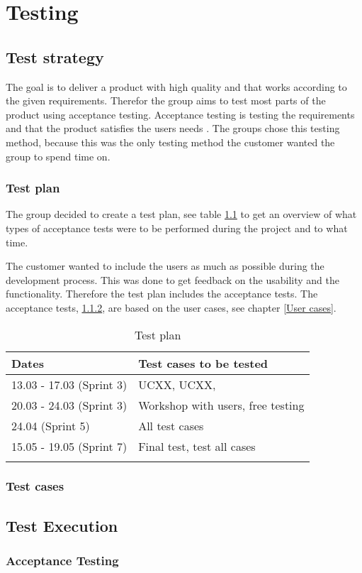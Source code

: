 
\chapter{Testing}

\section{Test strategy}
The goal is to deliver a product with high quality and that works according to the given requirements. Therefor the group aims to test most parts of the product using acceptance testing. Acceptance testing is testing the requirements and that the product satisfies the users needs \cite{acceptanceTesting}. The groups chose this testing method, because this was the only testing method the customer wanted the group to spend time on.

\subsection{Test plan}
The group decided to create a test plan, see table \ref{Test plan}  to get an overview of what types of acceptance tests were to be performed during the project and to what time.

The customer wanted to include the users as much as possible during the development process. This was done to get feedback on the usability and the functionality. Therefore the test plan includes the acceptance tests. The acceptance tests, \ref{Test cases}, are based on the user cases, see chapter \ref{User cases}.

\begin{longtable}{|l|l|}
\hline
\rowcolor{Gray}
\textbf{Dates} & \textbf{Test cases to be tested} \\
\hline
13.03 - 17.03 (Sprint 3) & UCXX, UCXX,   \\
\hline
20.03 - 24.03 (Sprint 3) & Workshop with users, free testing\\
\hline
24.04 (Sprint 5) & All test cases \\
\hline
15.05 - 19.05 (Sprint 7) & Final test, test all cases  \\
\hline
\caption{Test plan}
\label{Test plan}
\end{longtable}



\subsection{Test cases}
\label{Test cases}


\section{Test Execution}
\subsection{Acceptance Testing}

\cleardoublepage